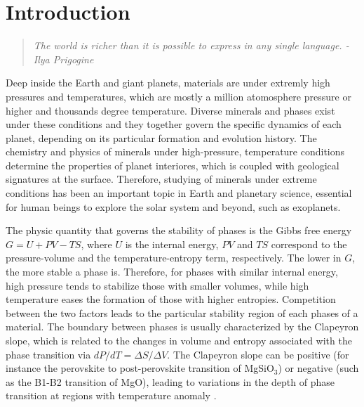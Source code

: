 \chapter{Introduction}\label{chap1}

\begin{quote}
{\small\textit{The world is richer than it is possible to express in any single language. - Ilya Prigogine}}
\end{quote}


Deep inside the Earth and giant planets, materials are under extremly high pressures and temperatures, which are mostly a million atomosphere pressure or higher and thousands degree temperature.
Diverse minerals and phases exist under these conditions and they together govern the specific dynamics of each planet, depending on its particular formation and evolution history. The chemistry and physics of minerals under high-pressure, temperature conditions determine the properties of planet interiores, which is coupled with geological signatures at the surface. Therefore, studying of minerals under extreme conditions has been an important topic in Earth and planetary science, essential for human beings to explore the solar system and beyond, such as exoplanets. 

The physic quantity that governs the stability of phases is the Gibbs free energy $G=U+PV-TS$, where $U$ is the internal energy, $PV$ and $TS$ correspond to the pressure-volume and the temperature-entropy term, respectively. The lower in $G$, the more stable a phase is. Therefore, for phases with similar internal energy, high pressure tends to stabilize those with smaller volumes, while high temperature eases the formation of those with higher entropies.  Competition between the two factors leads to the particular stability region of each phases of a material. The boundary between phases is usually characterized by the Clapeyron slope, which is related to the changes in volume and entropy associated with the phase transition via $dP/dT=\Delta S/\Delta V$. The Clapeyron slope can be positive (for instance the perovskite to post-perovskite transition of MgSiO$_3$) or negative (such as the B1-B2 transition of MgO), leading to variations in the depth of phase transition at regions with temperature anomaly \cite{Karato-book}.

